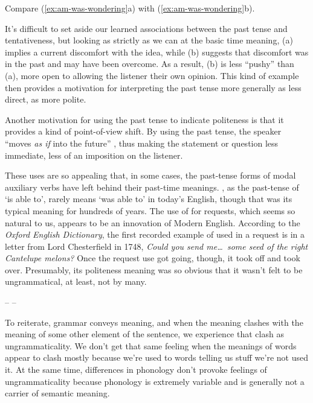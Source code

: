 Compare (\ref{ex:am-was-wondering}a) with (\ref{ex:am-was-wondering}b).

\ea \label{ex:am-was-wondering}
    \z
\z

It's difficult to set aside our learned associations between the past tense and tentativeness, but looking as strictly as we can at the basic time meaning, (a) implies a current discomfort with the idea, while (b) suggests that discomfort was in the past and may have been overcome. As a result, (b) is less \enquote{pushy} than (a), more open to allowing the listener their own opinion. This kind of example then provides a motivation for interpreting the past tense more generally as less direct, as more polite.

Another motivation for using the past tense to indicate politeness is that it provides a kind of point-of-view shift. By using the past tense, the speaker \enquote{moves \textit{as if} into the future} \citep[204]{Brown1978}, thus making the statement or question less immediate, less of an imposition on the listener.

These uses are so appealing that, in some cases, the past-tense forms of modal auxiliary verbs have left behind their past-time meanings. , as the past-tense of  `is able to', rarely means `was able to' in today's English, though that was its typical meaning for hundreds of years. The use of  for requests, which seems so natural to us, appears to be an innovation of Modern English. %
According to the \textit{Oxford English Dictionary}, the first recorded example of  used in a request is in a letter from Lord Chesterfield in 1748, \textit{Could you send me\dots~some seed of the right Cantelupe melons?} Once the request use got going, though, it took off and took over. Presumably, its politeness meaning was so obvious that it wasn't felt to be ungrammatical, at least, not by many.

\begin{center}
    -- --
\end{center}

To reiterate, grammar conveys meaning, and when the meaning clashes with the meaning of some other element of the sentence, we experience that clash as ungrammaticality. We don't get that same feeling when the meanings of words appear to clash mostly because we're used to words telling us stuff we're not used it. At the same time, differences in phonology don't provoke feelings of ungrammaticality because phonology is extremely variable and is generally not a carrier of semantic meaning.

